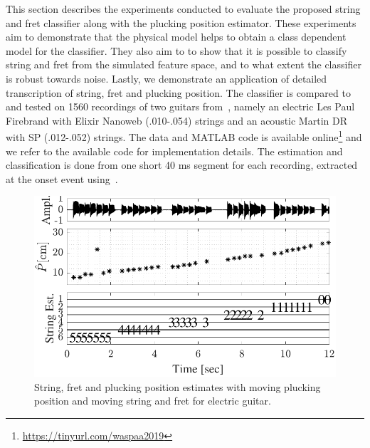 This section describes the experiments conducted to evaluate the proposed string and fret classifier along with the plucking position estimator. These experiments aim to demonstrate that the physical model helps to obtain a class dependent model for the classifier. They also aim to to show that it is possible to classify string and fret from the simulated feature space, and to what extent the classifier is robust towards noise. Lastly, we demonstrate an application of detailed transcription of string, fret and plucking position. The classifier is compared to~\cite{hjerrild::icassp19} and tested on 1560 recordings of two guitars from~\cite{hjerrild::icassp19}, namely an electric Les Paul Firebrand with Elixir Nanoweb (.010-.054) strings and an acoustic Martin DR with SP (.012-.052) strings. The data and MATLAB code is available online\footnote{\url{https://tinyurl.com/waspaa2019}} and we refer to the available code for implementation details. The estimation and classification is done from one short 40 ms segment for each recording, extracted at the onset event using~\cite{olivier:mirtoolbox_dafx}. %
%
\begin{figure}[t]
\centering
   \includegraphics[width=.9\linewidth]{img/plucking_estimates}\vspace{-2mm}
   \caption{String, fret and plucking position estimates with moving plucking position and moving string and fret for electric guitar.}
   \label{fig:pluck_position_fixed_tabs} 
\end{figure}
%

